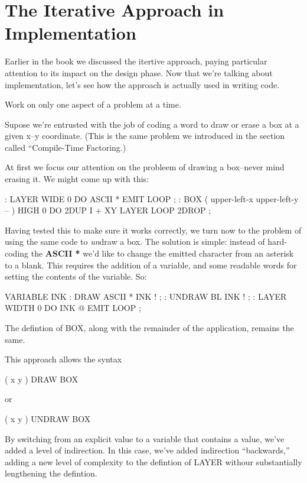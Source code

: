 \section{{{{The Iterative Approach in Implementation}}}}
Earlier in the book we discussed the itertive approach, paying particular attention to its impact on the design phase. Now that we're talking about implementation, let's see how the approach is actually used in writing code.

\begin{tip}
Work on only one aspect of a problem at a time.
\end{tip}
Supose we're entrusted with the job of coding a word to draw or erase a box at a given x--y coordinate. (This is the same problem we introduced in the section called ``Compile-Time Factoring.)

At first we focus our attention on the probleem of drawing a box--never mind erasing it. We might come up with this:

\begin{Code}
: LAYER   WIDE  0 DO  ASCII * EMIT  LOOP ;
: BOX   ( upper-left-x  upper-left-y -- )
   HIGH  0 DO  2DUP  I +  XY LAYER  LOOP  2DROP ;
\end{Code}
Having tested this to make sure it works correctly, we turn now to the problem of using the same code to \emph{un}draw a box. The solution is simple: instead of hard-coding the \textbf{ASCII *} we'd like to change the emitted character from an asterisk to a blank. This requires the addition of a variable, and some readable words for setting the contents of the variable. So:

\begin{Code}
VARIABLE INK
: DRAW   ASCII *  INK ! ;
: UNDRAW   BL  INK ! ;
: LAYER   WIDTH  0 DO  INK @  EMIT  LOOP ;
\end{Code}
The defintion of BOX, along with the remainder of the application, remains the same.

This approach allows the syntax

\begin{Code}
( x y ) DRAW BOX
\end{Code}
or

\begin{Code}
( x y ) UNDRAW BOX
\end{Code}
By switching from an explicit value to a variable that contains a value, we've added a level of indirection. In this case, we've added indirection ``backwards,'' adding a new level of complexity to the defintion of LAYER withour substantially lengthening the defintion.

